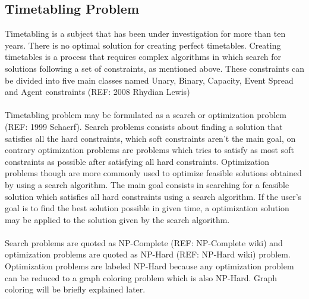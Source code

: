 \subsection{Timetabling Problem}
Timetabling is a subject that has been under investigation for more than ten years. There is no optimal solution for creating perfect timetables. Creating timetables is a process that requires complex algorithms in which search for solutions following a set of constraints, as mentioned above. These constraints can be divided into five main classes named Unary, Binary, Capacity, Event Spread and Agent constraints (REF: 2008 Rhydian Lewis)\\
\\
Timetabling problem may be formulated as a search or optimization problem (REF: 1999 Schaerf). Search problems consists about finding a solution that satisfies all the hard constraints, which soft constraints aren't the main goal, on contrary optimization problems are problems which tries to satisfy as most soft constraints as possible after satisfying all hard constraints. Optimization problems though are more commonly used to optimize feasible solutions obtained by using a search algorithm. The main goal consists in searching for a feasible solution which satisfies all hard constraints using a search algorithm. If the user's goal is to find the best solution possible in given time, a optimization solution may be applied to the solution given by the search algorithm.\\
\\
Search problems are quoted as NP-Complete (REF: NP-Complete wiki) and optimization problems are quoted as NP-Hard (REF: NP-Hard wiki) problem. Optimization problems are labeled NP-Hard because any optimization problem can be reduced to a graph coloring problem which is also NP-Hard. Graph coloring will be briefly explained later.\\
\\

